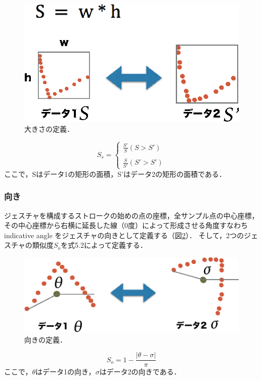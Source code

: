 \begin{figure} [h!]
	\begin{center}
		\includegraphics [width=0.4\hsize ]{img/v_size.eps}
	\end{center}
	\caption{大きさの定義．}
	\label{fig:v_size}
\end{figure}

\begin{equation}
S_\textit{s} = \left \{
\begin{array}{l}
\frac{S'}{S} (S>S') \\\\
\frac{S}{S'} (S'>S')
\end{array}
\right.
\end{equation}
ここで，Sはデータ1の矩形の面積，S'はデータ2の矩形の面積である．

\subsubsection{向き}
ジェスチャを構成するストロークの始めの点の座標，全サンプル点の中心座標，その中心座標から右横に延長した線（0度）によって形成させる角度すなわち indicative angle をジェスチャの向きとして定義する（図\ref{fig:v_orientation}）．
そして，2つのジェスチャの類似度$S_\textit{o}$を式5.2によって定義する．

\begin{figure} [h!]
	\begin{center}
		\includegraphics [width=0.55\hsize ]{img/v_orientation.eps}
	\end{center}
	\caption{向きの定義．}
	\label{fig:v_orientation}
\end{figure}

\begin{equation}
S_\textit{o} = 1 - \frac{|\theta - \sigma|}{\pi}
\end{equation}
ここで，$\theta$はデータ1の向き，$\sigma$はデータ2の向きである．

